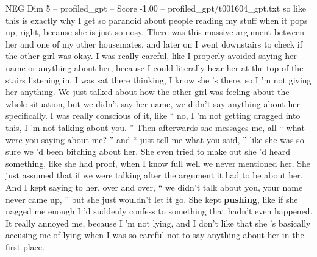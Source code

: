 \begin{textsample}{NEG Dim 5 – profiled\_gpt – Score -1.00 – profiled\_gpt/t001604\_gpt.txt}  \label{ex:f5_neg_028}
so like this is exactly why I get so paranoid about people reading my stuff when it pops up, right, because she is just so nosy.
There was this massive argument between her and one of my other housemates, and later on I went downstairs to check if the other girl was okay.
I was really careful, like I properly avoided saying her name or anything about her, because I could literally hear her at the top of the stairs listening in.
I was sat there thinking, I know she ’s there, so I ’m not giving her anything.
We just talked about how the other girl was feeling about the whole situation, but we didn't say her name, we didn't say anything about her specifically.
I was really conscious of it, like “ no, I ’m not getting dragged into this, I ’m not talking about you. ” Then afterwards she messages me, all “ what were you saying about me? ” and “ just tell me what you said, ” like she was so sure we ’d been bitching about her.
She even tried to make out she ’d heard something, like she had proof, when I know full well we never mentioned her.
She just assumed that if we were talking after the argument it had to be about her.
And I kept saying to her, over and over, “ we didn't talk about you, your name never came up, ” but she just wouldn't let it go.
She kept \textbf{pushing}, like if she nagged me enough I ’d suddenly confess to something that hadn't even happened.
It really annoyed me, because I ’m not lying, and I don't like that she ’s basically accusing me of lying when I was so careful not to say anything about her in the first place.

\end{textsample}
